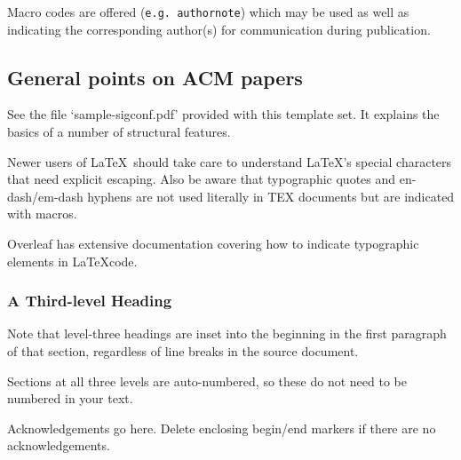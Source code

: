 \documentclass[sigconf]{acmart}
\begin{document}
Macro codes are offered (\texttt{e.g. authornote}) which may be used as well as indicating the corresponding author(s) for communication during publication.

\subsection{General points on ACM papers}
See the file `sample-sigconf.pdf' provided with this template set. It explains the basics of a number of structural features.

Newer users of \LaTeX\ should take care to understand \LaTeX's special characters that need explicit escaping. Also be aware that typographic quotes and en-dash/em-dash hyphens are not used literally in TEX documents but are indicated with macros.

Overleaf has extensive documentation covering how to indicate typographic elements in \LaTeX code.

\subsubsection{A Third-level Heading} 
Note that level-three headings are inset into the beginning in the first paragraph of that section, regardless of line breaks in the source document.

Sections at all three levels are auto-numbered, so these do not need to be numbered in your text.


\begin{acks}
Acknowledgements go here. Delete enclosing begin/end markers if there are no acknowledgements.
\end{acks}




\end{document}
